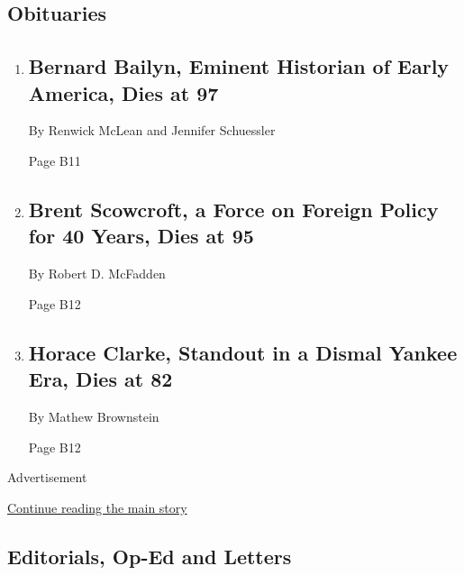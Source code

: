 \hypertarget{obituaries}{%
\subsection{Obituaries}\label{obituaries}}

\begin{enumerate}
\def\labelenumi{\arabic{enumi}.}
\item
  \href{/2020/08/07/books/bernard-bailyn-dead.html}{}

  \hypertarget{bernard-bailyn-eminent-historian-of-early-america-dies-at-97}{%
  \subsection{Bernard Bailyn, Eminent Historian of Early America, Dies
  at
  97}\label{bernard-bailyn-eminent-historian-of-early-america-dies-at-97}}

  By Renwick McLean and Jennifer Schuessler

  Page B11
\item
  \href{/2020/08/07/us/politics/brent-scowcroft-dead.html}{}

  \hypertarget{brent-scowcroft-a-force-on-foreign-policy-for-40-years-dies-at-95}{%
  \subsection{Brent Scowcroft, a Force on Foreign Policy for 40 Years,
  Dies at
  95}\label{brent-scowcroft-a-force-on-foreign-policy-for-40-years-dies-at-95}}

  By Robert D. McFadden

  Page B12
\item
  \href{/2020/08/07/sports/baseball/horace-clarke-dead.html}{}

  \hypertarget{horace-clarke-standout-in-a-dismal-yankee-era-dies-at-82}{%
  \subsection{Horace Clarke, Standout in a Dismal Yankee Era, Dies at
  82}\label{horace-clarke-standout-in-a-dismal-yankee-era-dies-at-82}}

  By Mathew Brownstein

  Page B12
\end{enumerate}

Advertisement

\protect\hyperlink{after-mid3}{Continue reading the main story}

\hypertarget{editorials-op-ed-and-letters}{%
\subsection{Editorials, Op-Ed and
Letters}\label{editorials-op-ed-and-letters}}

